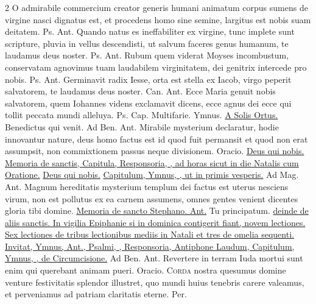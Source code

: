 \begin{multicols*}{2}
 O admirabile commercium creator generis humani animatum corpus sumens de virgine nasci dignatus est, et procedens homo sine semine, largitus est nobis suam deitatem. {\color{Red} Ps.}  {\color{Red} Ant.} Quando natus es ineffabiliter ex virgine, tunc implete sunt scripture, pluvia in vellus descendisti, ut salvum faceres genus humanum, te laudamus deus noster. {\color{Red} Ps.}  {\color{Red} Ant.} Rubum quem viderat Moyses incombustum, conservatam agnovimus tuam laudabilem virginitatem, dei genitrix intercede pro nobis. {\color{Red} Ps.}  {\color{Red} Ant.} Germinavit radix Iesse, orta est stella ex Iacob, virgo peperit salvatorem, te laudamus deus noster. {\color{Red} Can.}  {\color{Red} Ant.} Ecce Maria genuit nobis salvatorem, quem Iohannes videns exclamavit dicens, ecce agnus dei ecce qui tollit peccata mundi alleluya. {\color{Red} Ps.}  {\color{Red} Cap.} Multifarie. {\color{Red} Ymnus.} \hyperlink{a-solis-ortus}{A Solis Ortus.} \V Benedictus qui venit. {\color{Red} Ad Ben. Ant.} Mirabile mysterium declaratur, hodie innovantur nature, deus homo factus est id quod fuit permansit et quod non erat assumpsit, non commixtionem passus neque divisionem. {\color{Red} Oracio.} \hyperlink{deus-nobis-circumcisionis}{Deus qui nobis.} \ul{Memoria de sanctis, Capitula, Responsoria, \Vbar , ad horas sicut in die Natalis cum Oratione.} \hyperlink{deus-nobis-circumcisionis}{Deus qui nobis.}
 \ul{Capitulum, Ymnus, \Vbar , ut in primis vesperis.} {\color{Red} Ad Mag. Ant.} Magnum hereditatis mysterium templum dei factus est uterus nesciens virum, non est pollutus ex ea carnem assumens, omnes gentes venient dicentes gloria tibi domine.
\newline \ul{Memoria de sancto Stephano. Ant.} Tu principatum. \ul{deinde de aliis sanctis. In vigilia Epiphanie si in dominica contigerit fiant, novem lectiones. Sex lectiones de tribus lectionibus mediis in Natali et tres de omelia sequenti. Invitat, Ymnus, Ant., Psalmi, \Vbar , Responsoria, Antiphone Laudum, Capitulum, Ymnus, \Vbar , de Circumcisione.} {\color{Red} Ad Ben. Ant.} Revertere in terram Iuda mortui sunt enim qui querebant animam pueri. {\color{Red} Oracio.}
\lettrine[lines=2]{\zallmancaps \color{Blue} C}{orda} \hypertarget{corda-nostra-vigilia-epiphanie}{nostra} quesumus domine venture festivitatis splendor illustret, quo mundi huius tenebris carere valeamus, et perveniamus ad patriam claritatis eterne. Per.

\end{multicols*}
